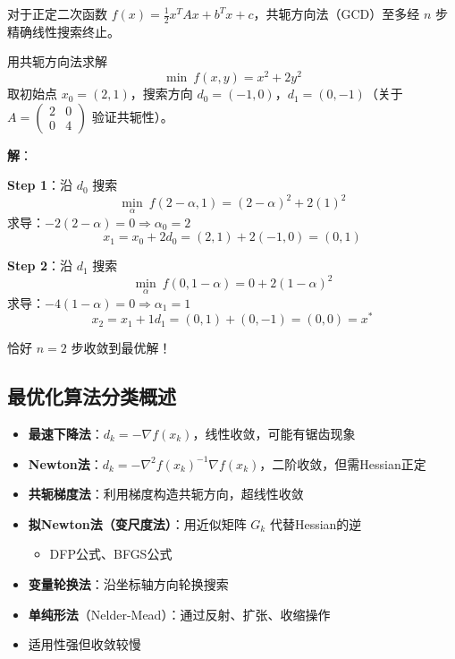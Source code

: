 \begin{theorem}[共轭方向法基本定理]
对于正定二次函数 $f(x) = \frac{1}{2}x^T A x + b^T x + c$，共轭方向法（GCD）至多经 $n$ 步精确线性搜索终止。
\end{theorem}

\begin{example}[共轭方向法迭代]
用共轭方向法求解
\[
\min\ f(x, y) = x^2 + 2y^2
\]
取初始点 $x_0 = (2, 1)$，搜索方向 $d_0 = (-1, 0)$，$d_1 = (0, -1)$（关于 $A = \begin{pmatrix} 2 & 0 \\ 0 & 4 \end{pmatrix}$ 验证共轭性）。

\textbf{解}：

\textbf{Step 1}：沿 $d_0$ 搜索
\[
\min_\alpha\ f(2-\alpha, 1) = (2-\alpha)^2 + 2(1)^2
\]
求导：$-2(2-\alpha) = 0 \Rightarrow \alpha_0 = 2$
\[
x_1 = x_0 + 2d_0 = (2, 1) + 2(-1, 0) = (0, 1)
\]

\textbf{Step 2}：沿 $d_1$ 搜索
\[
\min_\alpha\ f(0, 1-\alpha) = 0 + 2(1-\alpha)^2
\]
求导：$-4(1-\alpha) = 0 \Rightarrow \alpha_1 = 1$
\[
x_2 = x_1 + 1d_1 = (0, 1) + (0, -1) = (0, 0) = x^*
\]

恰好 $n=2$ 步收敛到最优解！
\end{example}

\subsection{最优化算法分类概述}

\begin{conceptbox}[使用导数的方法]
\begin{itemize}[itemsep=0.3em]
    \item \textbf{最速下降法}：$d_k = -\nabla f(x_k)$，线性收敛，可能有锯齿现象
    \item \textbf{Newton法}：$d_k = -\nabla^2 f(x_k)^{-1} \nabla f(x_k)$，二阶收敛，但需Hessian正定
    \item \textbf{共轭梯度法}：利用梯度构造共轭方向，超线性收敛
    \item \textbf{拟Newton法（变尺度法）}：用近似矩阵 $G_k$ 代替Hessian的逆
    \begin{itemize}
        \item DFP公式、BFGS公式
    \end{itemize}
\end{itemize}
\end{conceptbox}

\begin{conceptbox}
\begin{itemize}[itemsep=0.3em]
    \item \textbf{变量轮换法}：沿坐标轴方向轮换搜索
    \item \textbf{单纯形法}（Nelder-Mead）：通过反射、扩张、收缩操作
    \item 适用性强但收敛较慢
\end{itemize}
\end{conceptbox}

